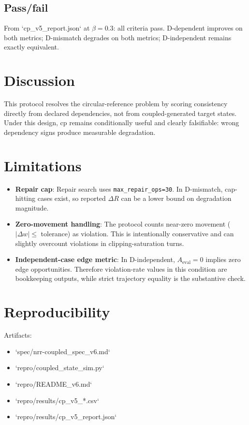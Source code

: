 \documentclass[11pt,a4paper]{article}
\begin{document}
\subsection{Pass/fail}
From `cp\_v5\_report.json` at \(\beta=0.3\): all criteria pass.
D-dependent improves on both metrics; D-mismatch degrades on both metrics; D-independent remains exactly equivalent.

\section{Discussion}
This protocol resolves the circular-reference problem by scoring consistency directly from declared dependencies, not from coupled-generated target states. Under this design, cp remains conditionally useful and clearly falsifiable: wrong dependency signs produce measurable degradation.

\section{Limitations}
\begin{itemize}
  \item \textbf{Repair cap}: Repair search uses \texttt{max\_repair\_ops=30}. In D-mismatch, cap-hitting cases exist, so reported \(\Delta R\) can be a lower bound on degradation magnitude.
  \item \textbf{Zero-movement handling}: The protocol counts near-zero movement (\(|\Delta w|\le\) tolerance) as violation. This is intentionally conservative and can slightly overcount violations in clipping-saturation turns.
  \item \textbf{Independent-case edge metric}: In D-independent, \(A_{\text{eval}}=0\) implies zero edge opportunities. Therefore violation-rate values in this condition are bookkeeping outputs, while strict trajectory equality is the substantive check.
\end{itemize}

\section{Reproducibility}
Artifacts:
\begin{itemize}
  \item `spec/nrr-coupled\_spec\_v6.md`
  \item `repro/coupled\_state\_sim.py`
  \item `repro/README\_v6.md`
  \item `repro/results/cp\_v5\_*.csv`
  \item `repro/results/cp\_v5\_report.json`
\end{itemize}
\end{document}

